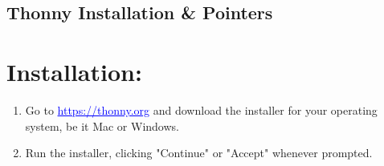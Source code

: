 \documentclass[11pt, letterpaper, onecolumn, oneside, final]{article}
\begin{document}
\begin{center}
\section{Thonny Installation \& Pointers}
\end{center}

\section{Installation:}
\begin{enumerate}
\item Go to \textcolor{blue}{\underline{https://thonny.org}} and download the installer for your operating system, be it Mac or Windows.
\item Run the installer, clicking "Continue" or "Accept" whenever prompted.
\end{enumerate}
\end{document}
